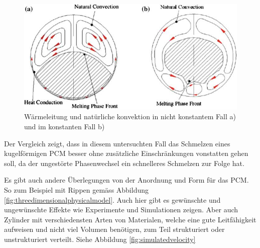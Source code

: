 \documentclass[11pt,a4paper]{scrartcl}
\begin{document}
\begin{figure}[h!]
\begin{center}
\includegraphics[scale=0.6]{images/heatconductionin.jpg}
\caption{Wärmeleitung und natürliche konvektion in nicht konstantem Fall a) und im konstanten Fall b) \cite{WasteEnergyHarvesting}}
\label{fig:heatconductionin}
\end{center}
\end{figure}

Der Vergleich zeigt, dass in diesem untersuchten Fall das Schmelzen eines
kugelförmigen PCM besser ohne zusätzliche Einschränkungen vonstatten
gehen soll, da der ungestörte Phasenwechsel ein schnelleres Schmelzen
zur Folge hat.

Es gibt auch andere Überlegungen von der Anordnung und Form für das PCM. So zum
Beispiel mit Rippen gemäss Abbildung \ref{fig:threedimensionalphysicalmodel}.
Auch hier gibt es gewünschte und ungewünschte Effekte wie Experimente und
Simulationen zeigen. Aber auch Zylinder mit verschiedensten Arten von
Materialen, welche eine gute Leitfähigkeit aufweisen und nicht viel Volumen
benötigen, zum Teil strukturiert oder unstrukturiert verteilt. Siehe
Abbildung \ref{fig:simulatedvelocity}
\end{document}
